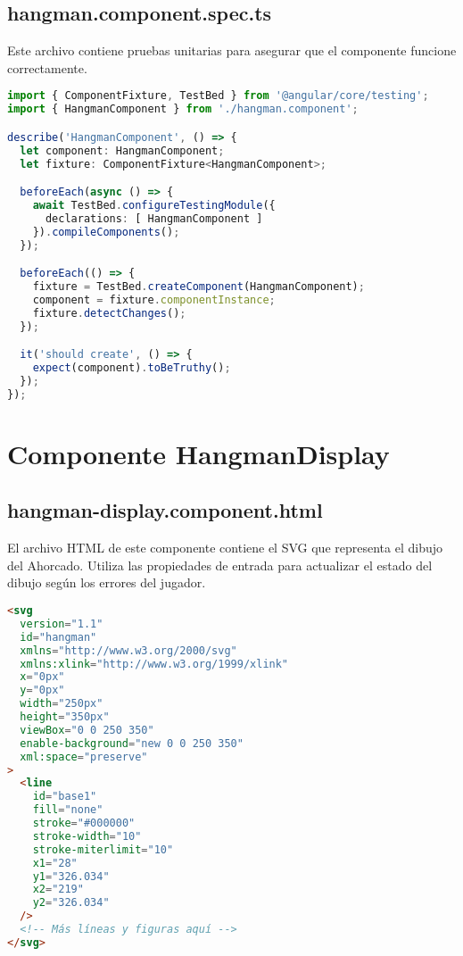\subsection{hangman.component.spec.ts}

Este archivo contiene pruebas unitarias para asegurar que el componente funcione correctamente.

\begin{lstlisting}[language=TypeScript]
import { ComponentFixture, TestBed } from '@angular/core/testing';
import { HangmanComponent } from './hangman.component';

describe('HangmanComponent', () => {
  let component: HangmanComponent;
  let fixture: ComponentFixture<HangmanComponent>;

  beforeEach(async () => {
    await TestBed.configureTestingModule({
      declarations: [ HangmanComponent ]
    }).compileComponents();
  });

  beforeEach(() => {
    fixture = TestBed.createComponent(HangmanComponent);
    component = fixture.componentInstance;
    fixture.detectChanges();
  });

  it('should create', () => {
    expect(component).toBeTruthy();
  });
});
\end{lstlisting}

\section{Componente HangmanDisplay}

\subsection{hangman-display.component.html}

El archivo HTML de este componente contiene el SVG que representa el dibujo del Ahorcado. Utiliza las propiedades de entrada para actualizar el estado del dibujo según los errores del jugador.

\begin{lstlisting}[language=HTML]
<svg
  version="1.1"
  id="hangman"
  xmlns="http://www.w3.org/2000/svg"
  xmlns:xlink="http://www.w3.org/1999/xlink"
  x="0px"
  y="0px"
  width="250px"
  height="350px"
  viewBox="0 0 250 350"
  enable-background="new 0 0 250 350"
  xml:space="preserve"
>
  <line
    id="base1"
    fill="none"
    stroke="#000000"
    stroke-width="10"
    stroke-miterlimit="10"
    x1="28"
    y1="326.034"
    x2="219"
    y2="326.034"
  />
  <!-- Más líneas y figuras aquí -->
</svg>
\end{lstlisting}

